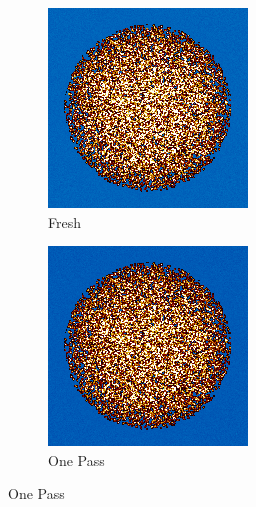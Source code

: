 \begin{figure}[H]
\centering
%
\begin{subfigure}{0.45\textwidth}
  \includegraphics[width=0.95\linewidth]{figures/burn-20-bstep0}
  \caption{Fresh}
  \label{fig:bstep0}
\end{subfigure}%
%
\begin{subfigure}{0.45\textwidth}
  \includegraphics[width=0.95\linewidth]{figures/burn-20-bstep1}
  \caption{One Pass}
  \label{fig:bstep1}
\end{subfigure}%


\end{figure}

